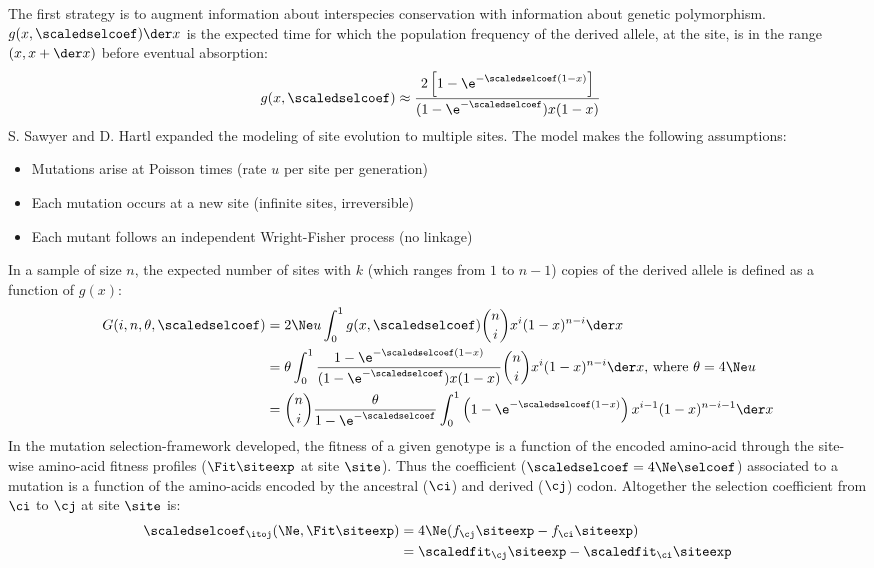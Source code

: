 The first strategy is to augment information about interspecies conservation with information about genetic polymorphism.
$g(x, \scaledselcoef) \der x $ is the expected time for which the population frequency of the derived \gls{allele}, at the site, is in the range $(x, x+\der x)$ before eventual absorption:
\begin{align}
	g(x, \scaledselcoef) & \approx \dfrac{2 \left[ 1 - \e^{-\scaledselcoef (1-x)}\right]}{(1 - \e^{-\scaledselcoef})x(1-x)}
\end{align}
S. Sawyer and D. Hartl expanded the modeling of site evolution to multiple sites.
The model makes the following assumptions:
\begin{itemize}
	\setlength\itemsep{-0.2em}
	\item Mutations arise at Poisson times (rate $u$ per site per generation)
	\item Each mutation occurs at a new site (infinite sites, irreversible)
	\item Each mutant follows an independent Wright-Fisher process (no linkage)
\end{itemize}
In a sample of size $n$, the expected number of sites with $k$ (which ranges from $1$ to $n-1$) copies of the derived \gls{allele} is defined as a function of $g(x)$:
\begin{align}
	G(i, n, \theta, \scaledselcoef) & = 2 \Ne u \int_{0}^{1} g(x, \scaledselcoef) \binom{n}{i} x^{i} (1-x)^{n-i} \der x \nonumber \\
	& = \theta \int_{0}^{1} \dfrac{1 - \e^{-\scaledselcoef (1-x)}}{(1 - \e^{-\scaledselcoef})x(1-x)} \binom{n}{i} x^{i} (1-x)^{n-i} \der x\text{, where } \theta=4\Ne u \nonumber \\
	& = \binom{n}{i} \dfrac{\theta }{1 - \e^{-\scaledselcoef}} \int_{0}^{1} \left( 1 - \e^{-\scaledselcoef (1-x)} \right) x^{i-1} (1-x)^{n-i-1} \der x
\end{align}
In the mutation selection-framework developed, the fitness of a given genotype is a function of the encoded amino-acid through the site-wise amino-acid fitness profiles ($ \Fit\siteexp $ at site $\site$). Thus the coefficient ($\scaledselcoef=4\Ne \selcoef $) associated to a mutation is a function of the amino-acids encoded by the ancestral ($\ci$) and derived ($\cj$) \gls{codon}. Altogether the selection coefficient from $\ci$ to $\cj$ at site $\site$ is:
\begin{align}
	\scaledselcoef_{\itoj}(\Ne, \Fit\siteexp) &= 4 \Ne (f_\cj\siteexp-f_\ci\siteexp) \nonumber \\
	& = \scaledfit_\cj\siteexp-\scaledfit_\ci\siteexp
\end{align}
